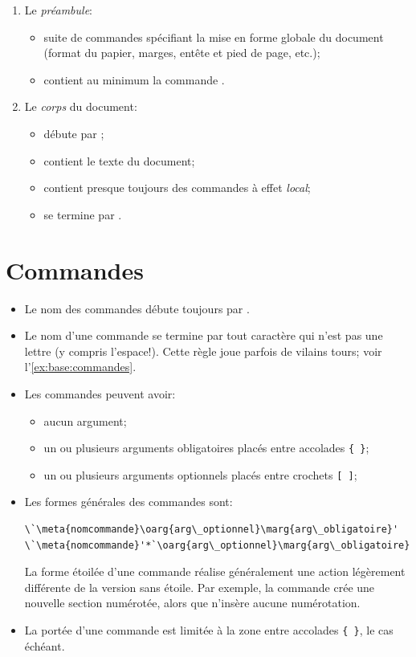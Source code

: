 \begin{enumerate}
\item Le \emph{préambule}:
  \begin{itemize}
  \item suite de commandes spécifiant la mise en forme globale
    du document (format du papier, marges, entête et pied de page,
    etc.);
  \item contient au minimum la commande \cmd{\documentclass}.
  \end{itemize}
\item Le \emph{corps} du document:
  \begin{itemize}
  \item débute par \verb==;
    \item contient le texte du document;
    \item contient presque toujours des commandes à effet
      \emph{local};
    \item se termine par \verb==.
  \end{itemize}
\end{enumerate}


\section{Commandes}

\begin{itemize}
\item Le nom des commandes débute toujours par {\bs}.
\item Le nom d'une commande se termine par tout caractère qui n'est
  pas une lettre (y compris l'espace!). Cette règle joue parfois de
  vilains tours; voir l'\autoref{ex:base:commandes}.
\item Les commandes peuvent avoir:
  \begin{itemize}
  \item aucun argument;
  \item un ou plusieurs arguments obligatoires placés entre accolades
    \verb={ }=;
  \item un ou plusieurs arguments optionnels placés entre crochets
    \verb=[ ]=;
  \end{itemize}
\item Les formes générales des commandes sont:
\begin{lstlisting}
\`\meta{nomcommande}\oarg{arg\_optionnel}\marg{arg\_obligatoire}'
\`\meta{nomcommande}'*`\oarg{arg\_optionnel}\marg{arg\_obligatoire}'
\end{lstlisting}
  La forme étoilée d'une commande réalise généralement une action
  légèrement différente de la version sans étoile. Par exemple, la
  commande \cmd{\section} crée une nouvelle section numérotée, alors
  que \cmd{\section*} n'insère aucune numérotation.
\item La portée d'une commande est limitée à la zone entre accolades
  \verb={ }=, le cas échéant.
\end{itemize}


